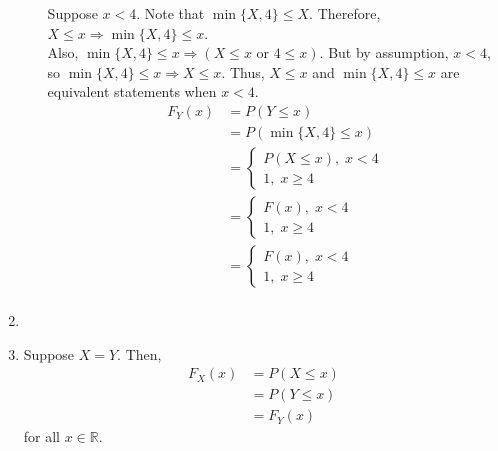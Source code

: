 \documentclass{article}
\newcommand{\R}{\mathbb{R}}
\begin{document}
\begin{enumerate}[label=\textbf{Question \arabic*.}]
\begin{enumerate}[label=(\alph*)]
				Suppose $x<4$. Note that $\min\{X, 4\}\leq X$. Therefore, $X\leq x\Rightarrow\min\{X, 4\}\leq x$.\\
				Also, $\min\{X, 4\}\leq x\Rightarrow (X\leq x \mbox{ or } 4\leq x)$. But by assumption, $x<4$, so $\min\{X, 4\}\leq x\Rightarrow X\leq x$. Thus, $X\leq x$ and $\min\{X, 4\}\leq x$ are equivalent statements when $x<4$.\\
				\begin{align*}
					F_Y(x)&=P(Y\leq x)\\
					&=P(\min\{X, 4\}\leq x)\\
					&=\begin{cases}
						P(X\leq x),\;x<4\\
						1,\;x\geq4
					\end{cases}\\
					&=\begin{cases}
						F(x),\;x<4\\
						1,\;x\geq4
					\end{cases}\\
					&=\begin{cases}
						F(x),\;x<4\\
						1,\;x\geq4
					\end{cases}\\
				\end{align*}
			\end{enumerate}
			
			
			\item ~
				
			\item Suppose $X=Y$. Then,
			\begin{align*}
				F_X(x)&=P(X\leq x)\\
				&=P(Y\leq x)\\
				&=F_Y(x)
			\end{align*}
			for all $x\in\R$.
		\end{enumerate}
\end{document}
